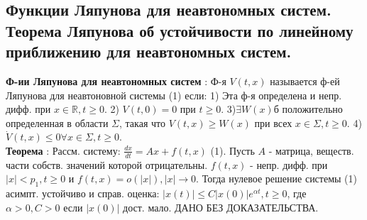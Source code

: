 \documentclass[unicode, 8pt, a4paper,oneside, landscape]{article}
\begin{document}
\begin{multicols}{4}

\subsection{Функции Ляпунова для неавтономных систем. Теорема Ляпунова об устойчивости по линейному приближению для неавтономных систем.}

{\bf Ф-ии Ляпунова для неавтономных систем} : Ф-я $V(t, x)$ называется ф-ей Ляпунова для неавтоновной системы (1) если: 1) Эта ф-я определена и непр. дифф. при $x \in \mathbb{R}, t \geq 0$. 2) $V(t, 0) = 0$ при $t \geq 0$. 3)$\exists W(x)$б положительно определенная в области $\Sigma$, такая что $V(t, x) \geq W(x)$ при всех $x \in \Sigma, t \geq 0$. 4) $\dot{V}(t, x) \leq 0 \forall x \in \Sigma, t\geq 0$.\\
{\bf Теорема} : Рассм. систему: $\frac{dx}{dt} = Ax + f(t, x)$ (1). Пусть $A$ - матрица, веществ. части собств. значений которой отрицательны. $f(t, x)$ - непр. дифф. при $|x| < p_1, t \geq 0$ и $f(t,x) = o(|x|), |x| \to 0$. Тогда нулевое решение системы (1) асимпт. устойчиво и справ. оценка: $|x(t)| \leq C|x(0)|e^{\alpha t}, t \geq 0$, где $\alpha > 0, C > 0$ если $|x(0)|$ дост. мало. ДАНО БЕЗ ДОКАЗАТЕЛЬСТВА.



\end{multicols}
\end{document}
